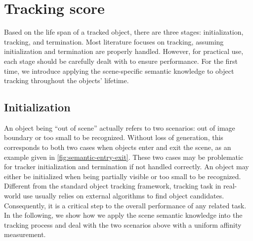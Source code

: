 \section{Tracking score}
Based on the life span of a tracked object, there are three stages: initialization, tracking, and termination. 
Most literature focuses on tracking, assuming initialization and termination are properly handled.
However, for practical use, each stage should be carefully dealt with to ensure performance. 
For the first time, we introduce applying the scene-specific semantic knowledge to object tracking throughout the objects' lifetime. 
\subsection{Initialization}     
    An object being ``out of scene'' actually refers to two scenarios: out of image boundary or too small to be recognized. Without loss of generation, this corresponds to both two cases when objects enter and exit the scene, as an example given in \ref{fig:semantic-entry-exit}. 
    These two cases may be problematic for tracker initialization and termination if not handled correctly. An object may either be initialized when being partially visible or too small to be recognized. 
    Different from the standard object tracking framework, tracking task in real-world use usually relies on external algorithms to find object candidates. Consequently, it is a critical step to the overall performance of any related task.
    In the following, we show how we apply the scene semantic knowledge into the tracking process and deal with the two scenarios above with a uniform affinity measurement. 

    
    
